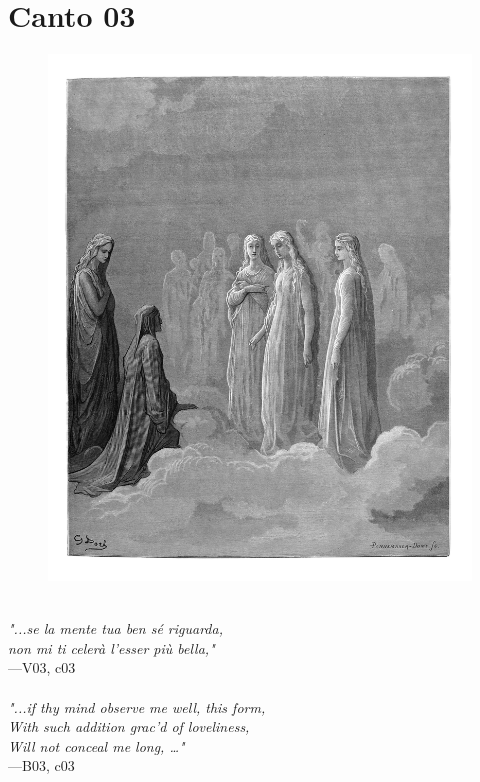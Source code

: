 \documentclass[../Dore_vision.tex]{subfiles}
\begin{document}
\section{Canto 03}

\begin{figure}[ht]
\centering
\includegraphics[height=\figsize]{illustrations/book_3/V03, c03.jpg}
\end{figure}

\begin{center}
\begin{minipage}{0.8\linewidth}
\textit{\\
"...se la mente tua ben sé riguarda,\\non mi ti celerà l’esser più bella,"} \\
—V03, c03 \\~\\
\textit{"...if thy mind observe me well, this form,\\With such addition grac'd of loveliness,\\Will not conceal me long, …"} \\
—B03, c03
\end{minipage}
\end{center}
\end{document}
